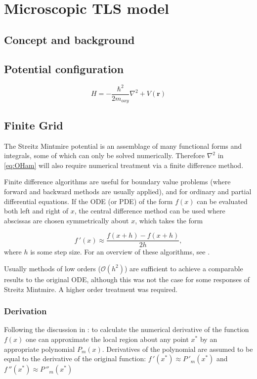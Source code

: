 \chapter{Microscopic TLS model}
\section{Concept and background}
\section{Potential configuration}


\begin{equation}
    H = -\frac{\hbar^2}{2m_{oxy}}\nabla^2+V(\mathbf{r})
    \label{eq:OHam}
\end{equation}


\section{Finite Grid}
The Streitz Mintmire potential \cite{Streitz1994} is an assemblage of many functional forms and integrals, some of which can only be solved numerically. Therefore $\nabla^2$ in \cref{eq:OHam} will also require numerical treatment via a finite difference method. 

Finite difference algorithms are useful for boundary value problems (where forward and backward methods are usually applied), and for ordinary and partial differential equations. If the ODE (or PDE) of the form $f(x)$ can be evaluated both left and right of $x$, the central difference method can be used where abscissas are chosen symmetrically about $x$, which takes the form

\begin{equation}
f\,'(x) \approx \frac{f(x+h)-f(x+h)}{2h},
\end{equation}
where $h$ is some step size. For an overview of these algorithms, see .
  
Usually methods of low orders (\eg $\mathcal{O}(h^2)$) are sufficient to achieve a comparable results to the original ODE, although this was not the case for some responses of Streitz Mintmire. A higher order treatment was required.

\subsection{Derivation}
Following the discussion in : to calculate the numerical derivative of the function $f(x)$ one can approximate the local region about any point $x^*$ by an appropriate polynomial $P_m(x)$. Derivatives of the polynomial are assumed to be equal to the derivative of the original function: $f\,'(x^*)\approx P\,'_m(x^*)$ and $f\,''(x^*)\approx P\,''_m(x^*)$ \etc

